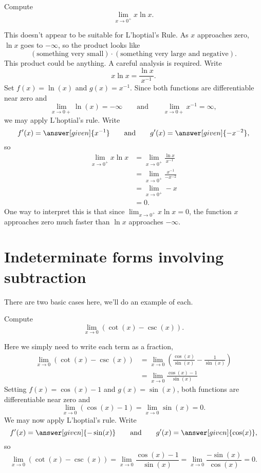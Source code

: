\documentclass{ximera}
\begin{document}
\begin{example}\label{example:xlnx infty} 
Compute 
\[
\lim_{x\to 0^+} x\ln x.
\]
\begin{explanation}
This doesn't appear to be suitable for L'hoptial's Rule. As $x$
approaches zero, $\ln x$ goes to $-\infty$, so the product looks like
\[
(\text{something very small})\cdot (\text{something very large and
  negative}).
\] 
This product could be anything. A careful analysis is required.
Write
\[
x\ln x = \frac{\ln x}{x^{-1}}.
\]
Set $f(x) = \ln(x)$ and $g(x) = x^{-1}$.  Since both functions are differentiable near zero and 
\[
\lim_{x\to 0+} \ln(x) = -\infty\qquad\text{and}\qquad \lim_{x\to 0+} x^{-1} = \infty,
\]
we may apply L'hoptial's rule. Write
\[
f'(x) = \answer[given]{x^{-1}}\qquad \text{and}\qquad g'(x) = \answer[given]{-x^{-2}},
\]
so
\begin{align*}
  \lim_{x\to 0^+} x\ln x &= \lim_{x\to 0^+} \frac{\ln x}{x^{-1}} \\
  &= \lim_{x\to 0^+} \frac{x^{-1}}{-x^{-2}}\\
  &=\lim_{x\to 0^+} -x \\
  &= 0.
\end{align*}
One way to interpret this is that since $\lim_{x\to 0^+}x\ln x = 0$,
the function $x$ approaches zero much faster than $\ln x$ approaches
$-\infty$.
\end{explanation}
\end{example}


\section{Indeterminate forms involving subtraction}

There are two basic cases here, we'll do an example of each.

\begin{example}
Compute
\[
\lim_{x\to 0} \left(\cot(x) - \csc(x)\right).
\]
\begin{explanation}
Here we simply need to write each term as a fraction,
\begin{align*}
\lim_{x\to 0} \left(\cot(x) - \csc(x)\right) &= \lim_{x\to 0} \left(\frac{\cos(x)}{\sin(x)} - \frac{1}{\sin(x)}\right)\\
&= \lim_{x\to 0} \frac{\cos(x)-1}{\sin(x)} 
\end{align*}
Setting $f(x) = \cos(x)-1$ and $g(x)=\sin(x)$, both functions are differentiable near zero and 
\[
\lim_{x\to 0}(\cos(x)-1)=\lim_{x\to 0}\sin(x) = 0.
\]
We may now apply L'hoptial's rule. Write
\[
f'(x) = \answer[given]{-\sin(x)}\qquad \text{and}\qquad g'(x) = \answer[given]{\cos(x)},
\]
so
\[
\lim_{x\to 0} \left(\cot(x) - \csc(x)\right) = \lim_{x\to 0} \frac{\cos(x)-1}{\sin(x)} = \lim_{x\to 0} \frac{-\sin(x)}{\cos(x)} =0.
\]
\end{explanation}
\end{example}
\end{document}
